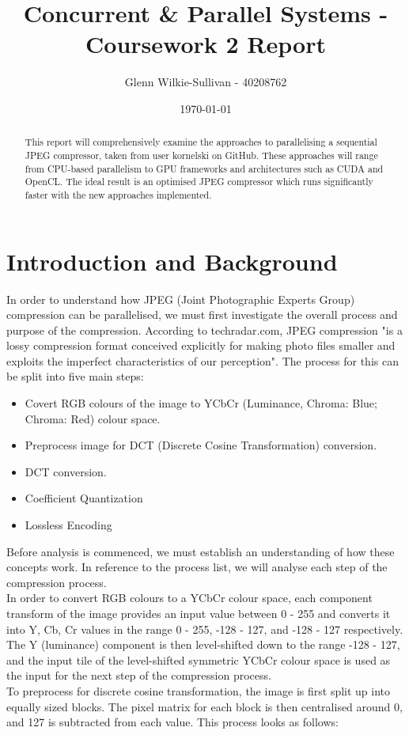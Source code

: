 \documentclass[12pt, a4paper]{article}
\title{\vspace{-3cm}Concurrent \& Parallel Systems - Coursework 2 Report}
\author{Glenn Wilkie-Sullivan - 40208762}
\date{\today}
\begin{document}
\maketitle

\begin{abstract}
\noindent This report will comprehensively examine the approaches to parallelising a sequential JPEG compressor, taken from user kornelski on GitHub. These approaches will range from CPU-based parallelism to GPU frameworks and architectures such as CUDA and OpenCL. The ideal result is an optimised JPEG compressor which runs significantly faster with the new approaches implemented.
\end{abstract}

\section{Introduction and Background}
In order to understand how JPEG (Joint Photographic Experts Group) compression can be parallelised, we must first investigate the overall process and purpose of the compression. According to techradar.com,  JPEG compression "is a lossy compression format conceived explicitly for making photo files smaller and exploits the imperfect characteristics of our perception". The process for this can be split into five main steps: 

\begin{itemize}
\item Covert RGB colours of the image to YCbCr (Luminance, Chroma: Blue; Chroma: Red) colour space.
\item Preprocess image for DCT (Discrete Cosine Transformation) conversion.
\item DCT conversion.
\item Coefficient Quantization
\item Lossless Encoding \\
\end{itemize}

Before analysis is commenced, we must establish an understanding of how these concepts work. In reference to the process list, we will analyse each step of the compression process. \\
In order to convert RGB colours to a YCbCr colour space, each component transform of the image provides an input value between 0 - 255 and converts it into Y, Cb, Cr values in the range 0 - 255, -128 - 127, and -128 - 127 respectively. The Y (luminance) component is then level-shifted down to the range -128 - 127, and the input tile of the level-shifted symmetric YCbCr colour space is used as the input for the next step of the compression process. \\
To preprocess for discrete cosine transformation, the image is first split up into equally sized blocks. The pixel matrix for each block is then centralised around 0, and 127 is subtracted from each value. This process looks as follows: \\
\end{document}
